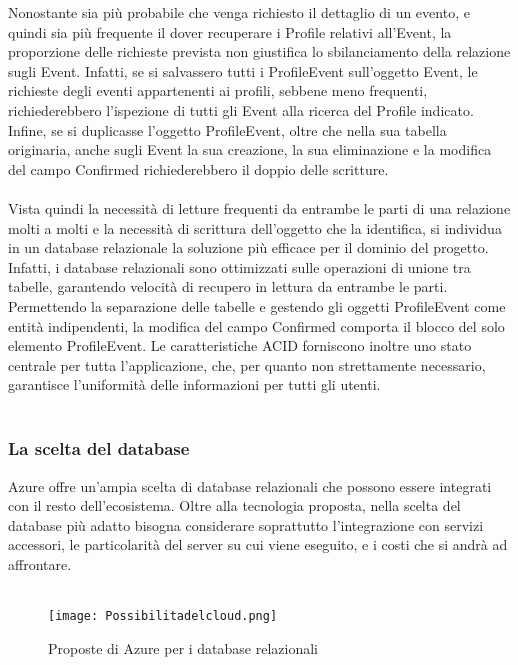Nonostante sia più probabile che venga richiesto il dettaglio di un evento, e quindi sia più frequente il dover recuperare i Profile relativi all’Event, 
la proporzione delle richieste prevista non giustifica lo sbilanciamento della relazione sugli Event.
Infatti, se si salvassero tutti i ProfileEvent sull’oggetto Event, le richieste degli eventi appartenenti ai profili, sebbene meno frequenti, 
richiederebbero l’ispezione di tutti gli Event alla ricerca del Profile indicato. 
Infine, se si duplicasse l’oggetto ProfileEvent, oltre che nella sua tabella originaria, anche sugli Event la sua creazione, 
la sua eliminazione e la modifica del campo Confirmed richiederebbero il doppio delle scritture.\\
\\
Vista quindi la necessità di letture frequenti da entrambe le parti di una relazione molti a molti e la necessità di scrittura dell’oggetto che la identifica, 
si individua in un database relazionale la soluzione più efficace per il dominio del progetto. 
Infatti, i database relazionali sono ottimizzati sulle operazioni di unione tra tabelle, garantendo velocità di recupero in lettura da entrambe le parti. 
Permettendo la separazione delle tabelle e gestendo gli oggetti ProfileEvent come entità indipendenti, 
la modifica del campo Confirmed comporta il blocco del solo elemento ProfileEvent. 
Le caratteristiche ACID forniscono inoltre uno stato centrale per tutta l’applicazione, che, 
per quanto non strettamente necessario, garantisce l’uniformità delle informazioni per tutti gli utenti.\\
\\

\clearpage
\subsubsection{La scelta del database}

Azure offre un’ampia scelta di database relazionali che possono essere integrati con il resto dell’ecosistema. 
Oltre alla tecnologia proposta, nella scelta del database più adatto bisogna considerare soprattutto l’integrazione con servizi accessori, 
le particolarità del server su cui viene eseguito, e i costi che si andrà ad affrontare.\\
\\
\begin{figure}[h!]
    \centering
    \texttt{[image: Possibilitadelcloud.png]}
    \caption{Proposte di Azure per i database relazionali}
\end{figure}	


